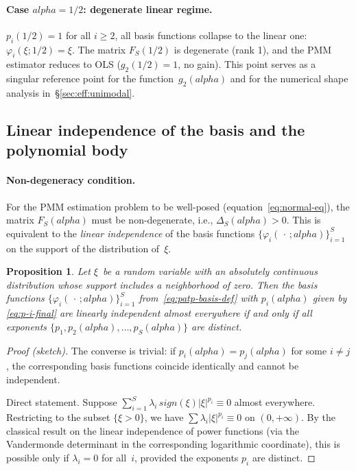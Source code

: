 \documentclass[11pt]{article}
\def\alpha{alpha}%
\def\mathbf#1{#1}%
\def\mathrm#1{#1}%
\def\tfrac#1#2{#1/#2}%
\newtheorem{proposition}[theorem]{Proposition}
\theoremstyle{definition}
\begin{document}
\paragraph{Case $\alpha = \tfrac{1}{2}$: degenerate linear regime.}
$p_i(\tfrac{1}{2}) = 1$ for all $i \geq 2$, all basis functions collapse
to the linear one: $\varphi_i(\xi; \tfrac{1}{2}) = \xi$. The matrix
$\mathbf{F}_S(\tfrac{1}{2})$ is degenerate (rank 1), and the PMM estimator
reduces to OLS ($g_2(\tfrac{1}{2}) = 1$, no gain). This point serves as
a singular reference point for the function~$g_2(\alpha)$ and for the
numerical shape analysis in~\S\ref{sec:eff:unimodal}.

\subsection{Linear independence of the basis and the polynomial body}\label{sec:patp:body}

\paragraph{Non-degeneracy condition.}
For the PMM estimation problem to be well-posed (equation~\eqref{eq:normal-eq}),
the matrix $\mathbf{F}_S(\alpha)$ must be non-degenerate, i.e.,
$\Delta_S(\alpha) > 0$. This is equivalent to the \emph{linear independence}
of the basis functions $\{\varphi_i(\,\cdot\,;\alpha)\}_{i=1}^{S}$ on the
support of the distribution of~$\xi$.

\begin{proposition}\label{prop:linindep}
Let $\xi$~be a random variable with an absolutely continuous distribution
whose support includes a neighborhood of zero. Then the basis functions
$\{\varphi_i(\,\cdot\,;\alpha)\}_{i=1}^{S}$ from~\eqref{eq:patp-basis-def}
with $p_i(\alpha)$ given by \eqref{eq:p-i-final} are linearly independent
\emph{almost everywhere} if and only if all exponents $\{p_1, p_2(\alpha),
\ldots, p_S(\alpha)\}$ are distinct.
\end{proposition}

\begin{proof}[Proof (sketch)]
The converse is trivial: if $p_i(\alpha) = p_j(\alpha)$ for some
$i \neq j$, the corresponding basis functions coincide identically and
cannot be independent.

Direct statement. Suppose $\sum_{i=1}^{S} \lambda_i\,
\mathrm{sign}(\xi)|\xi|^{p_i} \equiv 0$ almost everywhere. Restricting to
the subset $\{\xi > 0\}$, we have $\sum \lambda_i |\xi|^{p_i} \equiv 0$ on
$(0, +\infty)$. By the classical result on the linear independence of
power functions (via the Vandermonde determinant in the corresponding
logarithmic coordinate), this is possible only if $\lambda_i = 0$ for
all~$i$, provided the exponents $p_i$ are distinct.
\end{proof}
\end{document}
